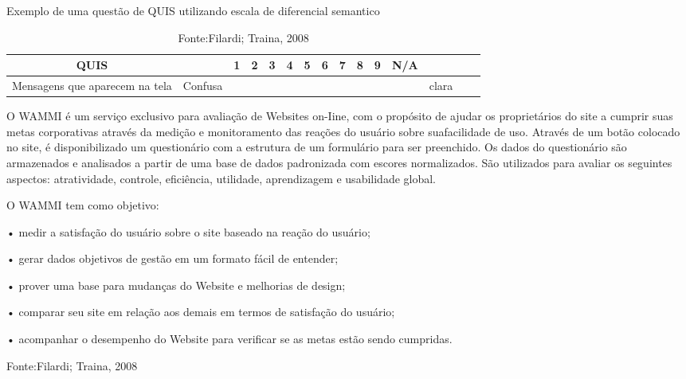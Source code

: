 \begin{table}[H]
	{Exemplo de uma questão de QUIS utilizando escala de diferencial semantico}
	\centering
	\begin{tabular}{|c|c|c|c|c|c|c|c|c|c|c|c|c|c|c|} 

		\hline
		   QUIS &  & 1 & 2 & 3 & 4 & 5 & 6 & 7 & 8 & 9 & N/A &  \\
		\hline
		Mensagens que aparecem na tela & Confusa &  &  &  &  &  &  &  &  &  &  & clara \\ 

		\hline
	\end{tabular}
	\caption {Fonte:Filardi; Traina, 2008}

\end{table}

	O WAMMI é um serviço exclusivo para avaliação de
Websites on-Iine, com o propósito de ajudar os proprietários
do site a cumprir suas metas corporativas através da
medição e monitoramento das reações do usuário sobre
suafacilidade de uso. Através de um botão colocado no site,
é disponibilizado um questionário com a estrutura de um
formulário para ser preenchido. Os dados do questionário
são armazenados e analisados a partir de uma base de dados
padronizada com escores normalizados. São utilizados para
avaliar os seguintes aspectos: atratividade, controle,
eficiência, utilidade, aprendizagem e usabilidade global.
	
	O WAMMI tem como objetivo: 

• medir a satisfação do usuário sobre o site baseado na
reação do usuário;

• gerar dados objetivos de gestão em um formato fácil de
entender;

• prover uma base para mudanças do Website e melhorias
de design;

• comparar seu site em relação aos demais em termos de
satisfação do usuário; 

• acompanhar o desempenho do Website para verificar se
as metas estão sendo cumpridas.

Fonte:Filardi; Traina, 2008